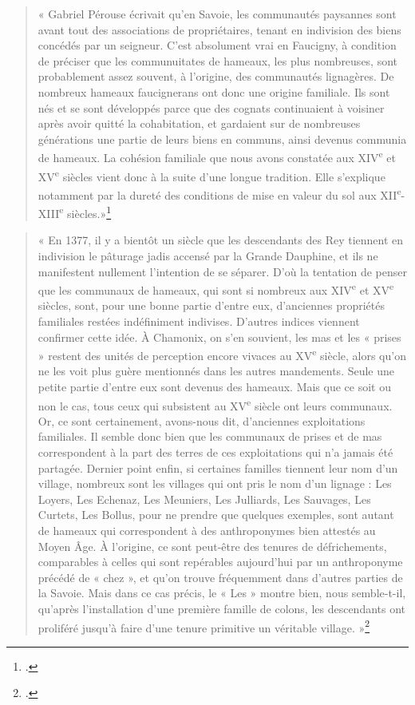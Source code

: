 \documentclass[12pt,a4paper]{report}
\begin{document}
	\begin{quote}
	« Gabriel Pérouse écrivait qu’en Savoie, les communautés paysannes sont avant tout des associations de propriétaires, tenant en indivision des biens concédés par un seigneur. C’est absolument vrai en Faucigny, à condition de préciser que les communuitates de hameaux, les plus nombreuses, sont probablement assez souvent, à l’origine, des communautés lignagères. De nombreux hameaux faucignerans ont donc une origine familiale. Ils sont nés et se sont développés parce que des cognats continuaient à voisiner après avoir quitté la cohabitation, et gardaient sur de nombreuses générations une partie de leurs biens en communs, ainsi devenus communia de hameaux. La cohésion familiale que nous avons constatée aux XIV\textsuperscript{e} et XV\textsuperscript{e} siècles vient donc à la suite d’une longue tradition. Elle s’explique notamment par la dureté des conditions de mise en valeur du sol aux XII\textsuperscript{e}-XIII\textsuperscript{e} siècles.»\footcite[248]{Carrier2001VieMontagnardeFaucigny}
\end{quote}

	\begin{quote}
	« En 1377, il y a bientôt un siècle que les descendants des Rey tiennent en indivision le pâturage jadis accensé par la Grande Dauphine, et ils ne manifestent nullement l’intention de se séparer. D’où la tentation de penser que les communaux de hameaux, qui sont si nombreux aux XIV\textsuperscript{e} et XV\textsuperscript{e} siècles, sont, pour une bonne partie d’entre eux, d’anciennes propriétés familiales restées indéfiniment indivises. D’autres indices viennent confirmer cette idée. À Chamonix, on s’en souvient, les mas et les « prises » restent des unités de perception encore vivaces au XV\textsuperscript{e} siècle, alors qu’on ne les voit plus guère mentionnés dans les autres mandements. Seule une petite partie d’entre eux sont devenus des hameaux. Mais que ce soit ou non le cas, tous ceux qui subsistent au XV\textsuperscript{e} siècle ont leurs communaux. Or, ce sont certainement, avons-nous dit, d’anciennes exploitations familiales. Il semble donc bien que les communaux de prises et de mas correspondent à la part des terres de ces exploitations qui n’a jamais été partagée. Dernier point enfin, si certaines familles tiennent leur nom d’un village, nombreux sont les villages qui ont pris le nom d’un lignage : Les Loyers, Les Echenaz, Les Meuniers, Les Julliards, Les Sauvages, Les Curtets, Les Bollus, pour ne prendre que quelques exemples, sont autant de hameaux qui correspondent à des anthroponymes bien attestés au Moyen Âge. À l’origine, ce sont peut-être des tenures de défrichements, comparables à celles qui sont repérables aujourd’hui par un anthroponyme précédé de « chez », et qu’on trouve fréquemment dans d’autres parties de la Savoie. Mais dans ce cas précis, le « Les » montre bien, nous semble-t-il, qu’après l’installation d’une première famille de colons, les descendants ont proliféré jusqu’à faire d’une tenure primitive un véritable village. »\footcite[247]{Carrier2001VieMontagnardeFaucigny}
\end{quote}
\end{document}
